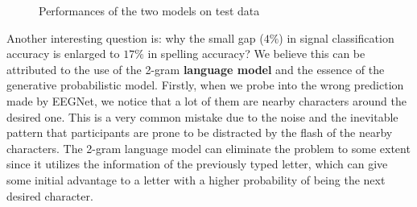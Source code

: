 \documentclass{article}
\begin{document}
\vspace{-3mm}
\begin{figure}[H]
	\centering
	\qquad
	\hspace{-8mm}
	\caption{Performances of the two models on test data}
	\label{fig:9}
\end{figure}

\vspace{-3mm}
Another interesting question is: why the small gap ($4\%$) in signal classification accuracy is enlarged to $17\%$ in spelling accuracy? We believe this can be attributed to the use of the 2-gram \textbf{language model} and the essence of the generative probabilistic model. Firstly, when we probe into the wrong prediction made by EEGNet, we notice that a lot of them are nearby characters around the desired one. This is a very common mistake due to the noise and the inevitable pattern that participants are prone to be distracted by the flash of the nearby characters. The 2-gram language model can eliminate the problem to some extent since it utilizes the information of the previously typed letter, which can give some initial advantage to a letter with a higher probability of being the next desired character.\\
\end{document}
